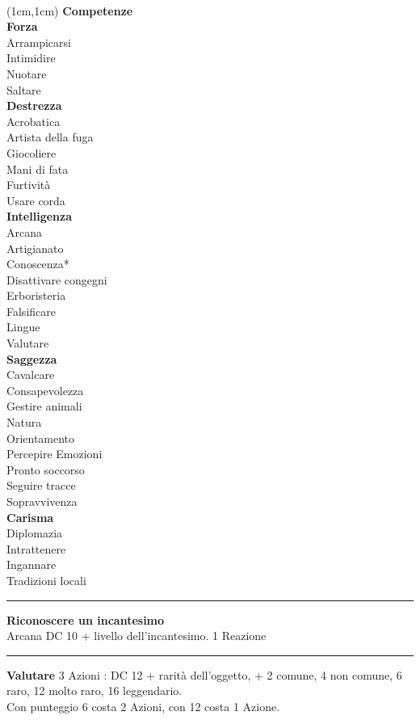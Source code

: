 \documentclass[a4paper,12 pt,openany]{book}
\newcommand{\riga}{\rule{\textwidth}{0.4pt}}
\begin{document}
~\newpage

\begin{textblock*}{4cm}(1cm,1cm) %
{\textbf{Competenze}\\
\textbf{Forza}\\
Arrampicarsi\\
Intimidire\\
Nuotare\\
Saltare	\\
\textbf{Destrezza}\\
Acrobatica\\
Artista della fuga\\
Giocoliere\\
Mani di fata\\
Furtività\\
Usare corda	\\
\textbf{Intelligenza}\\
Arcana\\
Artigianato\\
Conoscenza*\\
Disattivare congegni\\
Erboristeria\\
Falsificare\\
Lingue\\
Valutare\\
\textbf{Saggezza}\\
Cavalcare\\
Consapevolezza\\
Gestire animali\\
Natura\\
Orientamento\\
Percepire Emozioni\\
Pronto soccorso\\
Seguire tracce\\
Sopravvivenza\\
\textbf{Carisma}\\
Diplomazia\\
Intrattenere\\
Ingannare\\
Tradizioni locali
}

\riga

\textbf{Riconoscere un incantesimo}\\ Arcana DC 10 + livello dell'incantesimo. 1 Reazione

\riga

\textbf{Valutare} 3 Azioni : DC 12 + rarità dell'oggetto, + 2 comune, 4 non comune, 6 raro, 12 molto raro, 16 leggendario. \\
Con punteggio 6 costa 2 Azioni, con 12 costa 1 Azione.

\end{textblock*}
\end{document}
